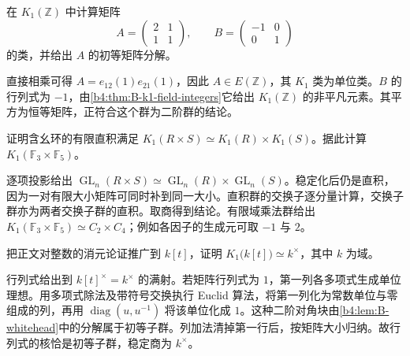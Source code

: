 \begin{exercise}\label{b4:ex:B-integer-matrix-kone}
	在 \(K_1(\mathbb Z)\) 中计算矩阵
	\[
		A=\begin{pmatrix}2&1\\1&1\end{pmatrix},
		\qquad B=\begin{pmatrix}-1&0\\0&1\end{pmatrix}
	\]
	的类，并给出 \(A\) 的初等矩阵分解。
\end{exercise}
\begin{solution}
	直接相乘可得 \(A=e_{12}(1)e_{21}(1)\)，因此 \(A\in E(\mathbb Z)\)，其 \(K_1\) 类为单位类。\(B\) 的行列式为 \(-1\)，由\cref{b4:thm:B-k1-field-integers}它给出 \(K_1(\mathbb Z)\) 的非平凡元素。其平方为恒等矩阵，正符合这个群为二阶群的结论。
\end{solution}

\begin{exercise}\label{b4:ex:B-product-kone}
	证明含幺环的有限直积满足 \(K_1(R\times S)\simeq K_1(R)\times K_1(S)\)。据此计算 \(K_1(\mathbb F_3\times\mathbb F_5)\)。
\end{exercise}
\begin{solution}
	逐项投影给出 \(\operatorname{GL}_n(R\times S)\simeq\operatorname{GL}_n(R)\times\operatorname{GL}_n(S)\)。稳定化后仍是直积，因为一对有限大小矩阵可同时补到同一大小。直积群的交换子逐分量计算，交换子群亦为两者交换子群的直积。取商得到结论。有限域乘法群给出 \(K_1(\mathbb F_3\times\mathbb F_5)\simeq C_2\times C_4\)；例如各因子的生成元可取 \(-1\) 与 \(2\)。
\end{solution}

\begin{exercise}\label{b4:ex:B-polynomial-kone}
	把正文对整数的消元论证推广到 \(k[t]\)，证明 \(K_1\bigl(k[t]\bigr)\simeq k^\times\)，其中 \(k\) 为域。
\end{exercise}
\begin{solution}
	行列式给出到 \(k[t]^\times=k^\times\) 的满射。若矩阵行列式为 \(1\)，第一列各多项式生成单位理想。用多项式除法及带符号交换执行 Euclid 算法，将第一列化为常数单位与零组成的列，再用 \(\operatorname{diag}(u,u^{-1})\) 将该单位化成 \(1\)。这种二阶对角块由\cref{b4:lem:B-whitehead}中的分解属于初等子群。列加法清掉第一行后，按矩阵大小归纳。故行列式的核恰是初等子群，稳定商为 \(k^\times\)。
\end{solution}

